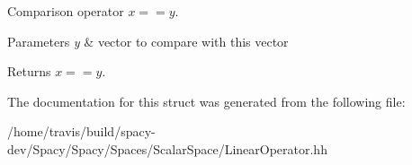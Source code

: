 Comparison operator $ x==y$. 


\begin{DoxyParams}{Parameters}
{\em y} & vector to compare with this vector \\
\hline
\end{DoxyParams}
\begin{DoxyReturn}{Returns}
$ x==y$. 
\end{DoxyReturn}


The documentation for this struct was generated from the following file\-:\begin{DoxyCompactItemize}
\item 
/home/travis/build/spacy-\/dev/\-Spacy/\-Spacy/\-Spaces/\-Scalar\-Space/Linear\-Operator.\-hh\end{DoxyCompactItemize}
